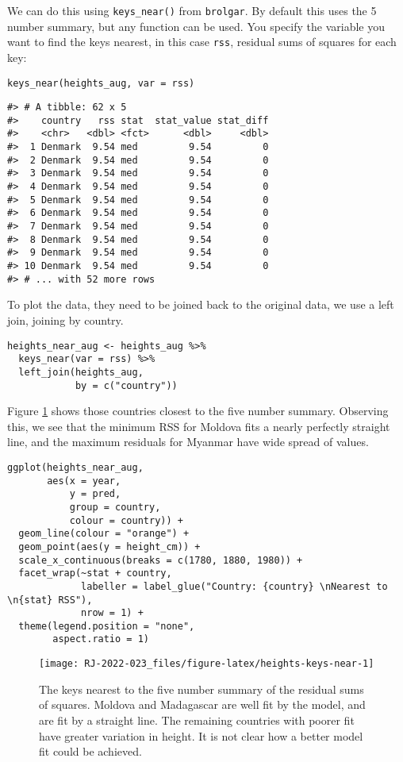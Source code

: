 We can do this using \texttt{keys\_near()} from \texttt{brolgar}. By default this uses the 5 number summary, but any function can be used. You specify the variable you want to find the keys nearest, in this case \texttt{rss}, residual sums of squares for each key:

\begin{verbatim}
keys_near(heights_aug, var = rss)
\end{verbatim}

\begin{verbatim}
#> # A tibble: 62 x 5
#>    country   rss stat  stat_value stat_diff
#>    <chr>   <dbl> <fct>      <dbl>     <dbl>
#>  1 Denmark  9.54 med         9.54         0
#>  2 Denmark  9.54 med         9.54         0
#>  3 Denmark  9.54 med         9.54         0
#>  4 Denmark  9.54 med         9.54         0
#>  5 Denmark  9.54 med         9.54         0
#>  6 Denmark  9.54 med         9.54         0
#>  7 Denmark  9.54 med         9.54         0
#>  8 Denmark  9.54 med         9.54         0
#>  9 Denmark  9.54 med         9.54         0
#> 10 Denmark  9.54 med         9.54         0
#> # ... with 52 more rows
\end{verbatim}

To plot the data, they need to be joined back to the original data, we use a left join, joining by country.

\begin{verbatim}
heights_near_aug <- heights_aug %>% 
  keys_near(var = rss) %>% 
  left_join(heights_aug, 
            by = c("country"))
\end{verbatim}

Figure \ref{fig:heights-keys-near} shows those countries closest to the five number summary. Observing this, we see that the minimum RSS for Moldova fits a nearly perfectly straight line, and the maximum residuals for Myanmar have wide spread of values.

\begin{verbatim}
ggplot(heights_near_aug,
       aes(x = year,
           y = pred,
           group = country,
           colour = country)) + 
  geom_line(colour = "orange") + 
  geom_point(aes(y = height_cm)) + 
  scale_x_continuous(breaks = c(1780, 1880, 1980)) +
  facet_wrap(~stat + country,
             labeller = label_glue("Country: {country} \nNearest to \n{stat} RSS"),
             nrow = 1) + 
  theme(legend.position = "none",
        aspect.ratio = 1)
\end{verbatim}

\begin{figure}

{\centering \texttt{[image: RJ-2022-023\_files/figure-latex/heights-keys-near-1]} 

}

\caption{The keys nearest to the five number summary of the residual sums of squares. Moldova and Madagascar are well fit by the model, and are fit by a straight line. The remaining countries with poorer fit have greater variation in height. It is not clear how a better model fit could be achieved.}\label{fig:heights-keys-near}
\end{figure}


